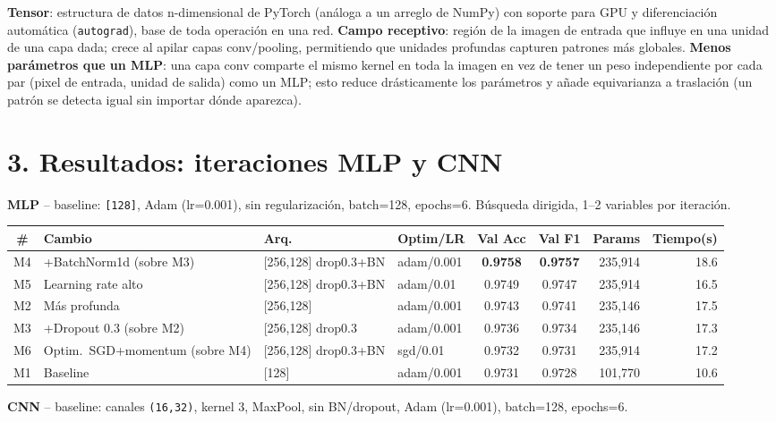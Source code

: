 \documentclass[9pt]{extarticle}
\begin{document}
\textbf{Tensor}: estructura de datos n-dimensional de PyTorch (análoga a un arreglo de NumPy) con soporte para GPU y diferenciación automática (\texttt{autograd}), base de toda operación en una red. \textbf{Campo receptivo}: región de la imagen de entrada que influye en una unidad de una capa dada; crece al apilar capas conv/pooling, permitiendo que unidades profundas capturen patrones más globales. \textbf{Menos parámetros que un MLP}: una capa conv comparte el mismo kernel en toda la imagen en vez de tener un peso independiente por cada par (pixel de entrada, unidad de salida) como un MLP; esto reduce drásticamente los parámetros y añade equivarianza a traslación (un patrón se detecta igual sin importar dónde aparezca).

\section*{3. Resultados: iteraciones MLP y CNN}
\textbf{MLP} -- baseline: \texttt{[128]}, Adam (lr=0.001), sin regularización, batch=128, epochs=6. Búsqueda dirigida, 1--2 variables por iteración.
\begin{center}
\footnotesize
\begin{tabular}{@{}clllccrr@{}}
\toprule
\textbf{\#} & \textbf{Cambio} & \textbf{Arq.} & \textbf{Optim/LR} & \textbf{Val Acc} & \textbf{Val F1} & \textbf{Params} & \textbf{Tiempo(s)} \\
\midrule
M4 & +BatchNorm1d (sobre M3) & [256,128] drop0.3+BN & adam/0.001 & \textbf{0.9758} & \textbf{0.9757} & 235,914 & 18.6 \\
M5 & Learning rate alto & [256,128] drop0.3+BN & adam/0.01 & 0.9749 & 0.9747 & 235,914 & 16.5 \\
M2 & Más profunda & [256,128] & adam/0.001 & 0.9743 & 0.9741 & 235,146 & 17.5 \\
M3 & +Dropout 0.3 (sobre M2) & [256,128] drop0.3 & adam/0.001 & 0.9736 & 0.9734 & 235,146 & 17.3 \\
M6 & Optim.\ SGD+momentum (sobre M4) & [256,128] drop0.3+BN & sgd/0.01 & 0.9732 & 0.9731 & 235,914 & 17.2 \\
M1 & Baseline & [128] & adam/0.001 & 0.9731 & 0.9728 & 101,770 & 10.6 \\
\bottomrule
\end{tabular}
\normalsize
\end{center}
\textbf{CNN} -- baseline: canales \texttt{(16,32)}, kernel 3, MaxPool, sin BN/dropout, Adam (lr=0.001), batch=128, epochs=6.
\end{document}

